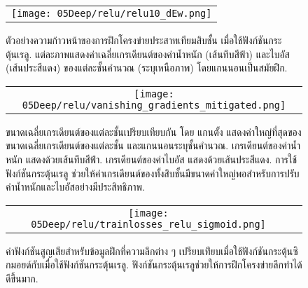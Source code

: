 %
\begin{figure}
	\begin{center}
		\begin{tabular}{c}
			\texttt{[image: 05Deep/relu/relu10\_dEw.png]}	
		\end{tabular}		
		\caption[ความก้าวหน้าของการฝึกโครงข่ายประสาทเทียมสิบชั้น เมื่อใช้ฟังก์ชันกระตุ้นเรลู]{
			ตัวอย่างความก้าวหน้าของการฝึกโครงข่ายประสาทเทียมสิบชั้น เมื่อใช้ฟังก์ชันกระตุ้นเรลู.
			แต่ละภาพแสดงค่าเฉลี่ยเกรเดียนต์ของค่าน้ำหนัก (เส้นทึบสีฟ้า) และไบอัส (เส้นประสีแดง) ของแต่ละชั้นคำนวณ (ระบุเหนือภาพ)
			โดยแกนนอนเป็นสมัยฝึก.
		}
		\label{fig: deep vanishing gradient mitigated with relu}
	\end{center}
\end{figure}
%

%
\begin{figure}
	\begin{center}
		\begin{tabular}{c}
			\texttt{[image: 05Deep/relu/vanishing\_gradients\_mitigated.png]}	
		\end{tabular}		
		\caption[การเลือนหายของเกรเดียนต์บรรเทาลงด้วยการเปลี่ยนฟังก์ชันกระตุ้น]{
			ขนาดเฉลี่ยเกรเดียนต์ของแต่ละชั้นเปรียบเทียบกัน 
			โดย
			แกนตั้ง แสดงค่าใหญ่ที่สุดของขนาดเฉลี่ยเกรเดียนต์ของแต่ละชั้น
			และแกนนอนระบุชั้นคำนวณ.
			เกรเดียนต์ของค่าน้ำหนัก แสดงด้วยเส้นทึบสีฟ้า.
			เกรเดียนต์ของค่าไบอัส แสดงด้วยเส้นประสีแดง.
			การใช้ฟังก์ชันกระตุ้นเรลู ช่วยให้ค่าเกรเดียนต์ของทั้งสิบชั้นมีขนาดค่าใหญ่พอสำหรับการปรับค่าน้ำหนักและไบอัสอย่างมีประสิทธิภาพ.
		}
		\label{fig: deep vanishing gradient sigmoid vs relu definitive}
	\end{center}
\end{figure}
%

%
\begin{figure}
	\begin{center}
		\begin{tabular}{cc}
			\texttt{[image: 05Deep/relu/trainlosses\_relu\_sigmoid.png]}
		\end{tabular}		
		\caption[ฟังก์ชันกระตุ้นเรลูช่วยให้การฝึกโครงข่ายลึกดีขึ้น]{ค่าฟังก์ชันสูญเสียสำหรับข้อมูลฝึกที่ความลึกต่าง ๆ เปรียบเท่ียบเมื่อใช้ฟังก์ชันกระตุ้นซิกมอยด์กับเมื่อใช้ฟังก์ชันกระตุ้นเรลู.
			ฟังก์ชันกระตุ้นเรลูช่วยให้การฝึกโครงข่ายลึกทำได้ดีขึ้นมาก.
		}
		\label{fig: deep vanishing gradient final training losses compared}
	\end{center}
\end{figure}

